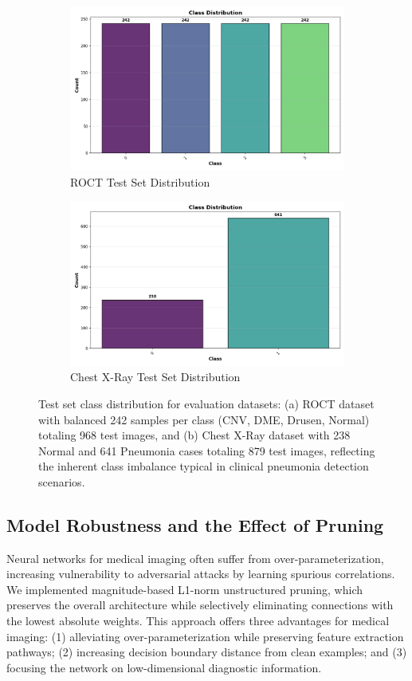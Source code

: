 \documentclass[preprint,12pt]{elsarticle}
\begin{document}
\begin{figure}[!t]
\centering
\begin{subfigure}[b]{\columnwidth}
\centering
\includegraphics[width=0.9\columnwidth]{fig/class_distribution_roct.png}
\caption{ROCT Test Set Distribution}
\end{subfigure}
\vspace{0.3cm}
\begin{subfigure}[b]{\columnwidth}
\centering
\includegraphics[width=0.9\columnwidth]{fig/class_distribution_chest_xray.png}
\caption{Chest X-Ray Test Set Distribution}
\end{subfigure}
\caption{Test set class distribution for evaluation datasets: (a) ROCT dataset with balanced 242 samples per class (CNV, DME, Drusen, Normal) totaling 968 test images, and (b) Chest X-Ray dataset with 238 Normal and 641 Pneumonia cases totaling 879 test images, reflecting the inherent class imbalance typical in clinical pneumonia detection scenarios.}
\label{fig:class_distribution}
\end{figure}

\subsection{Model Robustness and the Effect of Pruning}
Neural networks for medical imaging often suffer from over-parameterization, increasing vulnerability to adversarial attacks by learning spurious correlations. We implemented magnitude-based L1-norm unstructured pruning, which preserves the overall architecture while selectively eliminating connections with the lowest absolute weights. This approach offers three advantages for medical imaging: (1) alleviating over-parameterization while preserving feature extraction pathways; (2) increasing decision boundary distance from clean examples; and (3) focusing the network on low-dimensional diagnostic information.
\end{document}
